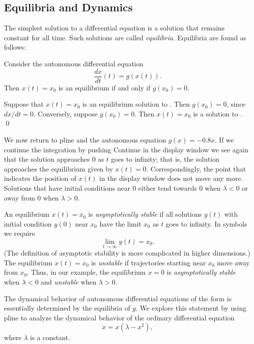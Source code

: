 \subsection*{Equilibria and Dynamics}

The simplest solution to a differential equation is a solution
that remains constant for all time.  Such solutions are called
{\em equilibria\/}.  Equilibria are found as follows:
\begin{lemma}  \label{L:equilibria}
Consider the autonomous  differential equation
\begin{equation} \label{aut}
\frac{dx}{dt}(t) = g(x(t)).
\end{equation}
Then $x(t)=x_0$ is an equilibrium  if and only
if $g(x_0)=0$.
\end{lemma}

\proof Suppose that $x(t)=x_0$ is an equilibrium solution to
. Then $g(x_0)=0$, since $dx/dt = 0$.  Conversely,
suppose $g(x_0)=0$.  Then $x(t)=x_0$ is a solution to .
\qed

We now return to {\sf pline} and the autonomous equation
$g(x)=-0.8x$.  If we continue the integration by pushing {\sf
Continue} in the display window we see again that the solution
approaches $0$ as $t$ goes to infinity; that is, the solution
approaches the equilibrium given by $x(t)=0$.  Correspondingly,
the point that indicates the position of $x(t)$ in the display
window does not move any more.  Solutions that have initial
conditions near $0$ either tend towards $0$ when $\lambda <
0$ or away from $0$ when $\lambda> 0$.

An equilibrium $x(t)=x_0$ is {\em asymptotically stable\/}
 if all solutions $y(t)$ with
initial condition $y(0)$ near $x_0$ have the limit
$x_0$ as $t$ goes to infinity.  In symbols we require
\[
\lim_{t\to\infty} y(t) = x_0.
\]
(The definition of asymptotic stability is more complicated in
higher dimensions.) The equilibrium $x(t)=x_0$ is {\em unstable\/}
 if trajectories starting near $x_0$ move away
from $x_0$.  Thus, in
our example, the equilibrium $x=0$ is {\em asymptotically
stable\/} when $\lambda< 0$ and {\em unstable\/}
when $\lambda> 0$.

The dynamical behavior of autonomous differential equations of
the form  is essentially determined by the equilibria
of $g$.  We explore this statement by using {\sf pline} to
analyze the dynamical behavior of the ordinary differential
equation
\begin{equation} \label{pitch_eq}
	\dot{x} = x(\lambda-x^2),
\end{equation}
where $\lambda$ is a constant.  

